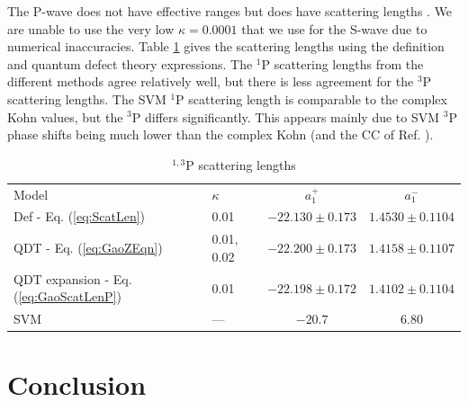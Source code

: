 \documentclass[preprint,showpacs,preprintnumbers,amsmath,amssymb,longbibliography,pra,aps]{revtex4-1}
\newcommand{\todoi}{\todo[inline]}
\begin{document}
The P-wave does not have effective ranges but does have scattering lengths \cite{Levy1963}. We are unable to use the very low $\kappa = 0.0001$ that we use for the S-wave due to numerical inaccuracies. Table \ref{tab:PWaveScatLen} gives the scattering lengths using the definition and quantum defect theory expressions. The $^1$P scattering lengths from the different methods agree relatively well, but there is less agreement for the $^3$P scattering lengths. The SVM \cite{Ivanov2002} $^1$P scattering length is comparable to the complex Kohn values, but the $^3$P differs significantly. This appears mainly due to SVM $^3$P phase shifts being much lower than the complex Kohn (and the CC of Ref. \cite{Blackwood2002}).

\begin{table}[H]
\begin{center}
\begin{ruledtabular}
\begin{tabular}{l l c c}
Model & $\kappa$ & $a_1^+$ & $a_1^-$ \\
\colrule
Def - Eq. (\ref{eq:ScatLen}) & 0.01 & $-22.130 \pm 0.173$ & $1.4530 \pm 0.1104$ \\
QDT - Eq. (\ref{eq:GaoZEqn}) & 0.01, 0.02 & $-22.200 \pm 0.173$ & $1.4158 \pm 0.1107$ \\
QDT expansion - Eq. (\ref{eq:GaoScatLenP}) & 0.01 & $-22.198 \pm 0.172$ & $1.4102 \pm 0.1104$ \\
\colrule
SVM \cite{Ivanov2002} & --- & $-20.7$ & $6.80$ 
\end{tabular}
\end{ruledtabular}
\caption{$^{1,3}$P scattering lengths}
\label{tab:PWaveScatLen}
\end{center}
\end{table}






\section{Conclusion}
\end{document}
